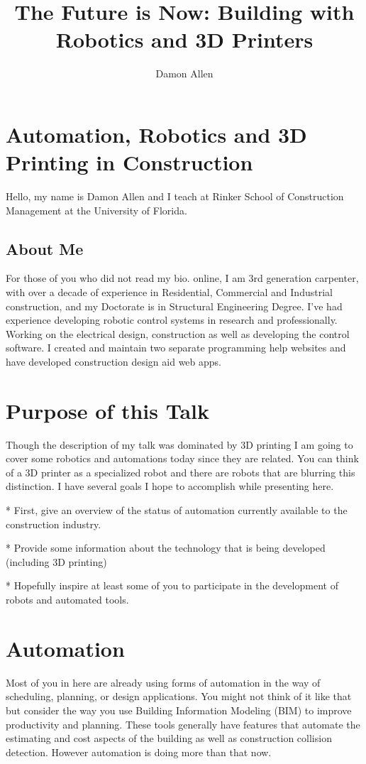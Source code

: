 \documentclass[11pt]{article}
\title{The Future is Now: Building with Robotics and 3D Printers}
\author{Damon Allen}
\begin{document}
\maketitle
\section{ Automation, Robotics and 3D Printing in Construction }
Hello, my name is Damon Allen and I teach at Rinker School of Construction Management at the University of Florida.
\subsection{About Me}
For those of you who did not read my bio. online, I am 3rd generation carpenter, with over a decade of experience in Residential, Commercial and Industrial construction, and my Doctorate is in Structural Engineering Degree.  I've had experience developing robotic control systems in research and professionally.  Working on the electrical design, construction as well as developing the control software.  I created and maintain two separate programming help websites and have developed construction design aid web apps.
\section{Purpose of this Talk}
Though the description of my talk was dominated by 3D printing I am going to cover some robotics and automations today since they are related.  You can think of a 3D printer as a specialized robot and there are robots that are blurring this distinction.  I have several goals I hope to accomplish while presenting here.



* First, give an overview of the status of automation currently available to the construction industry.

* Provide some information about the technology that is being developed (including 3D printing)

* Hopefully inspire at least some of you to participate in the development of robots and automated tools.
\section{Automation}
Most of you in here are already using forms of automation in the way of scheduling, planning, or design applications.  You might not think of it like that but consider the way you use Building Information Modeling (BIM) to improve productivity and planning.  These tools generally have features that automate the estimating and cost aspects of the building as well as construction collision detection. However automation is doing more than that now.
\end{document}
